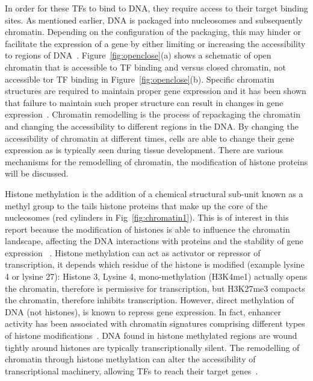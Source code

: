         
        In order for these TFs to bind to DNA, they require access to their target binding sites. As mentioned earlier, DNA is packaged into nucleosomes and subsequently chromatin. Depending on the configuration of the packaging, this may hinder or facilitate the expression of a gene by either limiting or increasing the accessibility to regions of DNA~\cite{li2007role}. Figure~\ref{fig:openclose}(a) shows a schematic of open chromatin that is accessible to TF binding and versus closed chromatin, not accessible tor TF binding in Figure~\ref{fig:openclose}(b). Specific chromatin structures are required to maintain proper gene expression and it has been shown that failure to maintain such proper structure can result in changes in gene expression~\cite{ehrlich2001dna}. Chromatin remodelling is the process of repackaging the chromatin and changing the accessibility to different regions in the DNA. By changing the accessibility of chromatin at different times, cells are able to change their gene expression as is typically seen during tissue development. There are various mechanisms for the remodelling of chromatin, the modification of histone proteins will be discussed.%

        Histone methylation is the addition of a chemical structural sub-unit known as a methyl group to the tails histone proteins that make up the core of the nucleosomes (red cylinders in Fig~\ref{fig:chromatin1}). This is of interest in this report because the modification of histones is able to influence the chromatin landscape, affecting the DNA interactions with proteins and the stability of gene expression ~\cite{jaenisch2003epigenetic, whetstine2009histone}. Histone methylation can act as activator or repressor of transcription, it depends which residue of the histone is modified (example lysine 4 or lysine 27):
        Histone 3, Lysine 4, mono-methylation (H3K4me1) actually opens the chromatin, therefore is permissive for transcription, but H3K27me3 compacts the chromatin, therefore inhibits transcription.
        However, direct methylation of DNA (not histones), is known to repress gene expression.
        In fact, enhancer activity has been associated with chromatin signatures comprising different types of histone modifications~\cite{heintzman2007distinct, creyghton2010histone, rada2011unique}.
        DNA found in histone methylated regions are wound tightly around histones are typically transcriptionally silent.
        The remodelling of chromatin through histone methylation can alter the accessibility of transcriptional machinery, allowing TFs to reach their target genes~\cite{gibney2010epigenetics, holoch2015rna}. 

